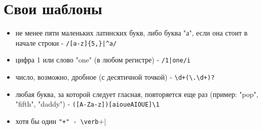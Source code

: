 \documentclass[12pt, a4paper]{article}
\begin{document}
\section{Свои шаблоны}
\begin{itemize}
  \item не менее пяти маленьких латинских букв, либо буква "а", если она стоит в начале строки
    - \verb=/[a-z]{5,}|^a/=
  \item цифра 1 или слово "one" (в любом регистре) - \verb=/1|one/i=
  \item число, возможно, дробное (с десятичной точкой) - \verb|\d+(\.\d+)?|
  \item любая буква, за которой следует гласная, повторяется еще раз
    (пример: "pop", "fifth", "daddy") - \verb|([A-Za-z])[aioueAIOUE]\1|
  \item хотя бы один \verb|"+" - \verb|\++|
\end{itemize}
\end{document}
